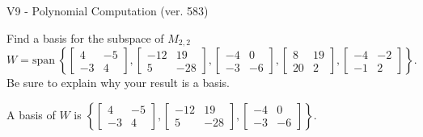 \begin{exercise}
  \begin{exerciseTitle}V9 - Polynomial Computation (ver. 583)\end{exerciseTitle}
  \begin{exerciseStatement}
    Find a basis for the subspace of \(M_{2,2}\) 
\[W=\mathrm{span}\ \left\{\left[\begin{array}{cc}
4 & -5 \\
-3 & 4
\end{array}\right] , \left[\begin{array}{cc}
-12 & 19 \\
5 & -28
\end{array}\right] , \left[\begin{array}{cc}
-4 & 0 \\
-3 & -6
\end{array}\right] , \left[\begin{array}{cc}
8 & 19 \\
20 & 2
\end{array}\right] , \left[\begin{array}{cc}
-4 & -2 \\
-1 & 2
\end{array}\right]\right\}.\]
 Be sure to explain why your result is a basis.


  \end{exerciseStatement}
  \begin{exerciseAnswer}
   A basis of \(W\) is  \(\left\{\left[\begin{array}{cc}
4 & -5 \\
-3 & 4
\end{array}\right] , \left[\begin{array}{cc}
-12 & 19 \\
5 & -28
\end{array}\right] , \left[\begin{array}{cc}
-4 & 0 \\
-3 & -6
\end{array}\right]\right\}\).
  


  \end{exerciseAnswer}
\end{exercise}